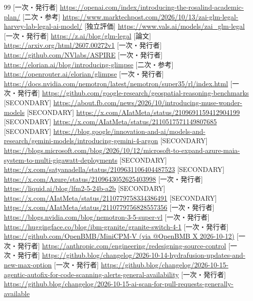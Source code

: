 \documentclass[lualatex,a4paper,10pt]{jlreq}
\begin{document}
\begin{thebibliography}{99}
 [一次・発行者] \url{https://openai.com/index/introducing-the-rosalind-academic-plan/}
 [二次・参考] \url{https://www.marktechpost.com/2026/10/13/zai-glm-legal-harvey-lab-legal-ai-model/}
 [独立評価] \url{https://www.vals.ai/models/zai_glm-legal}
 [一次・発行者] \url{https://z.ai/blog/glm-legal}
 [論文] \url{https://arxiv.org/html/2607.00272v1}
 [一次・発行者] \url{https://github.com/NVlabs/ASPIRE}
 [一次・発行者] \url{https://elorian.ai/blog/introducing-glimpse}
 [二次・参考] \url{https://openrouter.ai/elorian/glimpse}
 [一次・発行者] \url{https://docs.nvidia.com/nemotron/latest/nemotron/super35/rl/index.html}
 [一次・発行者] \url{https://github.com/google-research/geospatial-reasoning-benchmarks}
 [SECONDARY] \url{https://about.fb.com/news/2026/10/introducing-muse-wonder-models}
 [SECONDARY] \url{https://x.com/AIatMeta/status/2109691159412904199}
 [SECONDARY] \url{https://x.com/AIatMeta/status/2110517571149807685}
 [SECONDARY] \url{https://blog.google/innovation-and-ai/models-and-research/gemini-models/introducing-gemini-4-argon}
 [SECONDARY] \url{https://blogs.microsoft.com/blog/2026/10/12/microsoft-to-expand-azure-maia-system-to-multi-gigawatt-deployments}
 [SECONDARY] \url{https://x.com/satyanadella/status/2109631106404487523}
 [SECONDARY] \url{https://x.com/Azure/status/2109643052625403998}
 [一次・発行者] \url{https://liquid.ai/blog/lfm2-5-24b-a2b}
 [SECONDARY] \url{https://x.com/AIatMeta/status/2110779758334386491}
 [SECONDARY] \url{https://x.com/AIatMeta/status/2110779756828557356}
 [一次・発行者] \url{https://blogs.nvidia.com/blog/nemotron-3-5-super-vl}
 [一次・発行者] \url{https://huggingface.co/blog/ibm-granite/granite-switch-4-1}
 [一次・発行者] \url{https://github.com/OpenBMB/MiniCPM-V (via @OpenBMB X 2026-10-12)}
 [一次・発行者] \url{https://anthropic.com/engineering/redesigning-source-control}
 [一次・発行者] \url{https://github.blog/changelog/2026-10-14-hydrafusion-updates-and-new-max-option}
 [一次・発行者] \url{https://github.blog/changelog/2026-10-15-agentic-autofix-for-code-scanning-alerts-general-availability}
 [一次・発行者] \url{https://github.blog/changelog/2026-10-15-ai-scan-for-pull-requests-generally-available}

\end{thebibliography}
\end{document}
